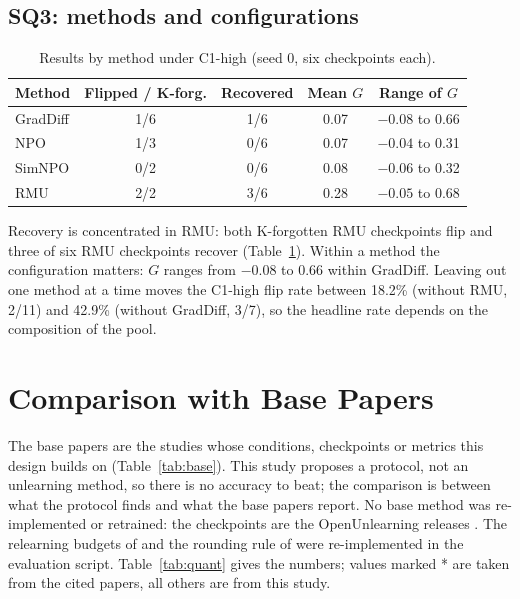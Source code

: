 \documentclass[conference]{IEEEtran}
\begin{document}
\subsection{SQ3: methods and configurations}
\begin{table}[t]
\caption{Results by method under C1-high (seed 0, six checkpoints each).}
\label{tab:method}
\centering
\scriptsize
\setlength{\tabcolsep}{3pt}
\begin{tabular}{@{}lcccc@{}}
\toprule
Method & Flipped / K-forg. & Recovered & Mean $G$ & Range of $G$ \\
\midrule
GradDiff & 1/6 & 1/6 & 0.07 & $-0.08$ to 0.66 \\
NPO & 1/3 & 0/6 & 0.07 & $-0.04$ to 0.31 \\
SimNPO & 0/2 & 0/6 & 0.08 & $-0.06$ to 0.32 \\
RMU & 2/2 & 3/6 & 0.28 & $-0.05$ to 0.68 \\
\bottomrule
\end{tabular}
\end{table}

Recovery is concentrated in RMU: both K-forgotten RMU checkpoints flip and three of six RMU checkpoints recover (Table~\ref{tab:method}). Within a method the configuration matters: $G$ ranges from $-0.08$ to 0.66 within GradDiff. Leaving out one method at a time moves the C1-high flip rate between 18.2\% (without RMU, 2/11) and 42.9\% (without GradDiff, 3/7), so the headline rate depends on the composition of the pool.

\section{Comparison with Base Papers}\label{sec:compare}
The base papers are the studies whose conditions, checkpoints or metrics this design builds on (Table~\ref{tab:base}). This study proposes a protocol, not an unlearning method, so there is no accuracy to beat; the comparison is between what the protocol finds and what the base papers report. No base method was re-implemented or retrained: the checkpoints are the OpenUnlearning releases \cite{dorna2025openunlearning}. The relearning budgets of \cite{fan2025sam,fan2025simnpo} and the rounding rule of \cite{zhang2025quant} were re-implemented in the evaluation script. Table~\ref{tab:quant} gives the numbers; values marked * are taken from the cited papers, all others are from this study.
\end{document}
